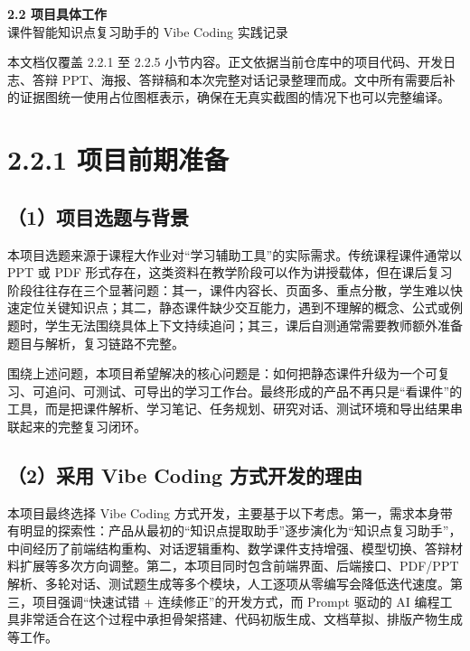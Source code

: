 \documentclass[UTF8,zihao=-4]{ctexart}
\begin{document}

\begin{center}
  {\LARGE\bfseries 2.2 项目具体工作}\\[0.7em]
  {\large 课件智能知识点复习助手的 Vibe Coding 实践记录}
\end{center}

\begin{notebox}
本文档仅覆盖 2.2.1 至 2.2.5 小节内容。正文依据当前仓库中的项目代码、开发日志、答辩 PPT、海报、答辩稿和本次完整对话记录整理而成。文中所有需要后补的证据图统一使用占位图框表示，确保在无真实截图的情况下也可以完整编译。
\end{notebox}

\section{2.2.1 项目前期准备}

\subsection*{（1）项目选题与背景}
本项目选题来源于课程大作业对“学习辅助工具”的实际需求。传统课程课件通常以 PPT 或 PDF 形式存在，这类资料在教学阶段可以作为讲授载体，但在课后复习阶段往往存在三个显著问题：其一，课件内容长、页面多、重点分散，学生难以快速定位关键知识点；其二，静态课件缺少交互能力，遇到不理解的概念、公式或例题时，学生无法围绕具体上下文持续追问；其三，课后自测通常需要教师额外准备题目与解析，复习链路不完整。

围绕上述问题，本项目希望解决的核心问题是：如何把静态课件升级为一个可复习、可追问、可测试、可导出的学习工作台。最终形成的产品不再只是“看课件”的工具，而是把课件解析、学习笔记、任务规划、研究对话、测试环境和导出结果串联起来的完整复习闭环。

\subsection*{（2）采用 Vibe Coding 方式开发的理由}
本项目最终选择 Vibe Coding 方式开发，主要基于以下考虑。第一，需求本身带有明显的探索性：产品从最初的“知识点提取助手”逐步演化为“知识点复习助手”，中间经历了前端结构重构、对话逻辑重构、数学课件支持增强、模型切换、答辩材料扩展等多次方向调整。第二，本项目同时包含前端界面、后端接口、PDF/PPT 解析、多轮对话、测试题生成等多个模块，人工逐项从零编写会降低迭代速度。第三，项目强调“快速试错 + 连续修正”的开发方式，而 Prompt 驱动的 AI 编程工具非常适合在这个过程中承担骨架搭建、代码初版生成、文档草拟、排版产物生成等工作。
\end{document}
